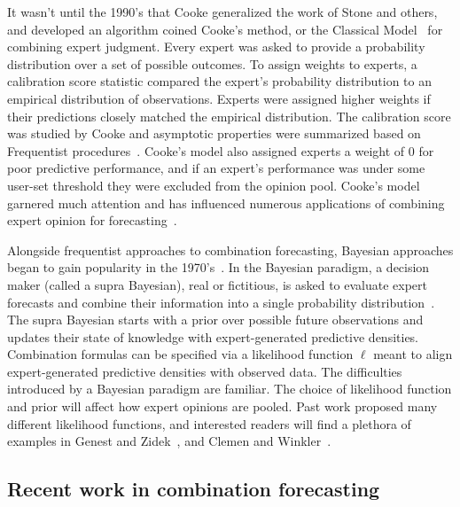 \documentclass[preprint,authoryear]{elsarticle}
\begin{document}
It wasn't until the 1990's that Cooke generalized the work of Stone and others, and developed an algorithm coined Cooke's method, or the Classical Model~\citep{cooke1988calibration,cooke1991experts} for combining expert judgment.
Every expert was asked to provide a probability distribution over a set of possible outcomes.
To assign weights to experts, a calibration score statistic compared the expert's probability distribution to an empirical distribution of observations.
Experts were assigned higher weights if their predictions closely matched the empirical distribution.
The calibration score was studied by Cooke and asymptotic properties were summarized based on Frequentist procedures~\citep{cooke1988calibration,cooke2015aggregation}.
Cooke's model also assigned experts a weight of $0$ for poor predictive performance, and
if an expert's performance was under some user-set threshold they were excluded from the opinion pool.
Cooke's model garnered much attention and has influenced numerous applications of combining expert opinion for forecasting~\citep{cooke2014validating,clemen2008comment,cooke2015aggregation}.

Alongside frequentist approaches to combination forecasting, Bayesian approaches began to gain popularity in the 1970's~\citep{morris1974decision}.
In the Bayesian paradigm, a decision maker (called a supra Bayesian), real or fictitious, is asked to evaluate expert forecasts and combine their information into a single probability distribution~\citep{hogarth1975cognitive,keeney1976group}.
The supra Bayesian starts with a prior over possible future observations and updates their state of knowledge with expert-generated predictive densities.
Combination formulas can be specified via a likelihood function $\ell$ meant to align expert-generated predictive densities with observed data.
The difficulties introduced by a Bayesian paradigm are familiar.
The choice of likelihood function and prior will affect how expert opinions are pooled. 
Past work proposed many different likelihood functions, and interested readers will find a plethora of examples in Genest and Zidek~\citep{genest1986combining}, and Clemen and Winkler~\cite{clemen1999combining,clemen1986combining,clemen1989combining}.

\subsection{Recent work in combination forecasting}
\end{document}
